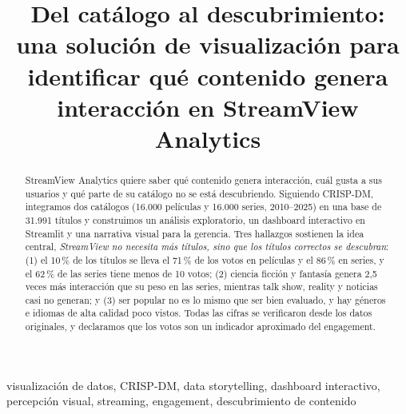 \documentclass[conference,a4paper]{IEEEtran}
\begin{document}
\title{Del catálogo al descubrimiento: una solución de visualización para identificar qué contenido genera interacción en StreamView Analytics}

\author{
}

\maketitle

\begin{abstract}
StreamView Analytics quiere saber qué contenido genera interacción, cuál gusta a sus usuarios y qué parte de su catálogo no se está descubriendo. Siguiendo CRISP-DM, integramos dos catálogos (16.000 películas y 16.000 series, 2010--2025) en una base de 31.991 títulos y construimos un análisis exploratorio, un dashboard interactivo en Streamlit y una narrativa visual para la gerencia. Tres hallazgos sostienen la idea central, \emph{StreamView no necesita más títulos, sino que los títulos correctos se descubran}: (1) el 10\,\% de los títulos se lleva el 71\,\% de los votos en películas y el 86\,\% en series, y el 62\,\% de las series tiene menos de 10 votos; (2) ciencia ficción y fantasía genera 2,5 veces más interacción que su peso en las series, mientras talk show, reality y noticias casi no generan; y (3) ser popular no es lo mismo que ser bien evaluado, y hay géneros e idiomas de alta calidad poco vistos. Todas las cifras se verificaron desde los datos originales, y declaramos que los votos son un indicador aproximado del engagement.
\end{abstract}

\renewcommand{\IEEEkeywordsname}{Palabras clave}
\begin{IEEEkeywords}
visualización de datos, CRISP-DM, data storytelling, dashboard interactivo, percepción visual, streaming, engagement, descubrimiento de contenido
\end{IEEEkeywords}

\end{document}
